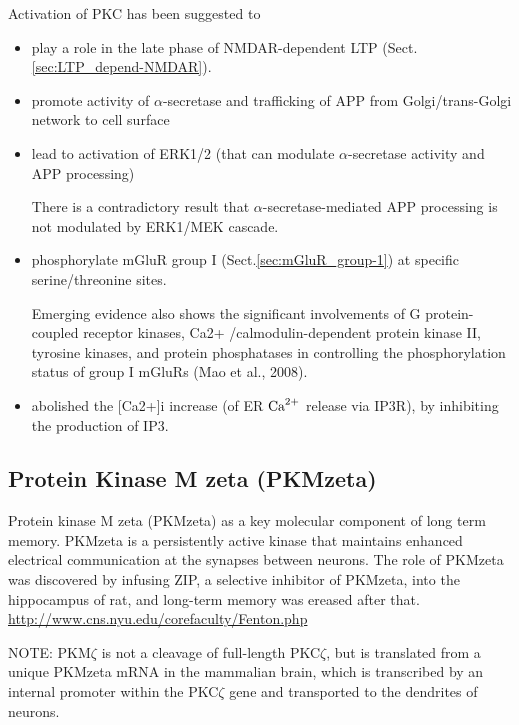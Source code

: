 Activation of PKC has been suggested to 
\begin{itemize}

  \item play a role in the late phase of NMDAR-dependent LTP
  (Sect.\ref{sec:LTP_depend-NMDAR}).

  \item promote activity of $\alpha$-secretase and trafficking of APP from
  Golgi/trans-Golgi network to cell surface
  
  \item lead to activation of ERK1/2 (that can modulate $\alpha$-secretase
  activity and APP processing)
  
There is a contradictory result that $\alpha$-secretase-mediated APP processing
is not modulated by ERK1/MEK cascade.

  \item phosphorylate mGluR group I (Sect.\ref{sec:mGluR_group-1}) at specific
  serine/threonine sites.
  
Emerging evidence also shows the significant involvements of G protein-coupled
receptor kinases, Ca2+ /calmodulin-dependent protein kinase II, tyrosine
kinases, and protein phosphatases in controlling the phosphorylation status of
group I mGluRs (Mao et al., 2008).
  
  \item abolished the [Ca2+]i increase (of ER ${\text{Ca}^{2+}}$ release via IP3R), by
  inhibiting the production of IP3.
\end{itemize}



 
\subsection{Protein Kinase M zeta (PKMzeta)}
\label{sec:PKMzeta}

Protein kinase M zeta (PKMzeta) as a key molecular component of long term
memory. PKMzeta is a persistently active kinase that maintains enhanced
electrical communication at the synapses between neurons.
The role of PKMzeta was discovered by infusing ZIP, a selective inhibitor of
PKMzeta, into the hippocampus of rat, and long-term memory was ereased after
that. \url{http://www.cns.nyu.edu/corefaculty/Fenton.php}

NOTE: PKM$\zeta$ is not a cleavage of full-length
PKC$\zeta$, but is translated from a unique PKMzeta mRNA in the mammalian brain,
which is transcribed by an internal promoter within the PKC$\zeta$ gene and
transported to the dendrites of neurons.

